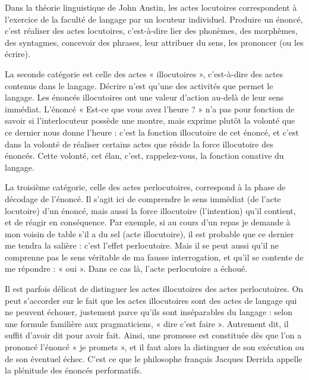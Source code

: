 Dans la théorie linguistique de John Austin, les actes locutoires correspondent à l’exercice de la faculté de langage par un locuteur individuel. Produire un énoncé, c’est réaliser des actes locutoires, c’est-à-dire lier des phonèmes, des morphèmes, des syntagmes, concevoir des phrases, leur attribuer du sens, les prononcer (ou les écrire).

La seconde catégorie est celle des actes « illocutoires », c’est-à-dire des actes contenus dans le langage. Décrire n’est qu’une des activités que permet le langage. Les énoncés illocutoires ont une valeur d’action au-delà de leur sens immédiat. L’énoncé « Est-ce que vous avez l’heure ? » n’a pas pour fonction de savoir si l’interlocuteur possède une montre, mais exprime plutôt la volonté que ce dernier nous donne l’heure : c’est la fonction illocutoire de cet énoncé, et c’est dans la volonté de réaliser certains actes que réside la force illocutoire des énoncés. Cette volonté, cet élan, c’est, rappelez-vous, la fonction conative du langage.

La troisième catégorie, celle des actes perlocutoires, correspond à la phase de décodage de l’énoncé. Il s’agit ici de comprendre le sens immédiat (de l’acte locutoire) d’un énoncé, mais aussi la force illocutoire (l’intention) qu’il contient, et de réagir en conséquence. Par exemple, si au cours d’un repas je demande à mon voisin de table s’il a du sel (acte illocutoire), il est probable que ce dernier me tendra la salière : c’est l’effet perlocutoire. Mais il se peut aussi qu’il ne comprenne pas le sens véritable de ma fausse interrogation, et qu’il se contente de me répondre : « oui ». Dans ce cas là, l’acte perlocutoire a échoué.

Il est parfois délicat de distinguer les actes illocutoires des actes perlocutoires. On peut s’accorder sur le fait que les actes illocutoires sont des actes de langage qui ne peuvent échouer, justement parce qu’ils sont inséparables du langage : selon une formule familière aux pragmaticiens, « dire c’est faire ». Autrement dit, il suffit d’avoir dit pour avoir fait. Ainsi, une promesse est constituée dès que l’on a prononcé l’énoncé « je promets », et il faut alors la distinguer de son exécution ou de son éventuel échec. C’est ce que le philosophe français Jacques Derrida appelle la plénitude des énoncés performatifs.

